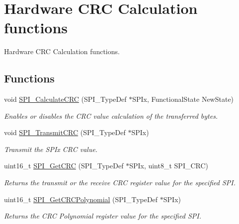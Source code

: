 \hypertarget{group___s_p_i___group3}{\section{Hardware C\-R\-C Calculation functions}
\label{group___s_p_i___group3}
}


Hardware C\-R\-C Calculation functions.  


\subsection*{Functions}
\begin{DoxyCompactItemize}
\item 
void \hyperlink{group___s_p_i___group3_ga64f7276d119e6cb58afc100f8832adb0}{S\-P\-I\-\_\-\-Calculate\-C\-R\-C} (S\-P\-I\-\_\-\-Type\-Def $\ast$S\-P\-Ix, Functional\-State New\-State)
\begin{DoxyCompactList}\small\item\em Enables or disables the C\-R\-C value calculation of the transferred bytes. \end{DoxyCompactList}\item 
void \hyperlink{group___s_p_i___group3_gace8b1058e09bab150b0dbe5978810273}{S\-P\-I\-\_\-\-Transmit\-C\-R\-C} (S\-P\-I\-\_\-\-Type\-Def $\ast$S\-P\-Ix)
\begin{DoxyCompactList}\small\item\em Transmit the S\-P\-Ix C\-R\-C value. \end{DoxyCompactList}\item 
uint16\-\_\-t \hyperlink{group___s_p_i___group3_ga4c81c193516e82cf0a2fdc149ef20cc6}{S\-P\-I\-\_\-\-Get\-C\-R\-C} (S\-P\-I\-\_\-\-Type\-Def $\ast$S\-P\-Ix, uint8\-\_\-t S\-P\-I\-\_\-\-C\-R\-C)
\begin{DoxyCompactList}\small\item\em Returns the transmit or the receive C\-R\-C register value for the specified S\-P\-I. \end{DoxyCompactList}\item 
uint16\-\_\-t \hyperlink{group___s_p_i___group3_ga80fb9374cfce670f29128bb78568353f}{S\-P\-I\-\_\-\-Get\-C\-R\-C\-Polynomial} (S\-P\-I\-\_\-\-Type\-Def $\ast$S\-P\-Ix)
\begin{DoxyCompactList}\small\item\em Returns the C\-R\-C Polynomial register value for the specified S\-P\-I. \end{DoxyCompactList}\end{DoxyCompactItemize}


